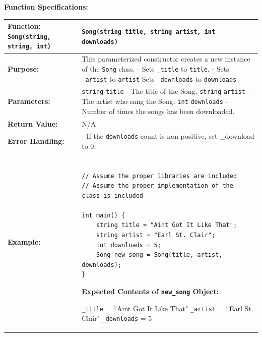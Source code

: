 \textbf{Function Specifications:}

\renewcommand{\arraystretch}{1.5}
\begin{longtable}{|p{1.7in}|p{4.3in}|}
\hline
\textbf{Function:} \texttt{Song(string, string, int)}& \texttt{Song(string title, string artist, int downloads)}\\ \hline

\textbf{Purpose:} & This parameterized constructor creates a new instance of the \texttt{Song} class. \newline
- Sets \texttt{_title} to \texttt{title}. \newline
- Sets \texttt{_artist} to \texttt{artist} \newline
Sets \texttt{_downloads} to \texttt{downloads}\\ \hline

\textbf{Parameters:} & 
\texttt{string} \texttt{title} - The title of the Song. \newline
\texttt{string} \texttt{artist} - The artist who sang the Song. \newline
\texttt{int} \texttt{downloads} - Number of times the songs has been downloaded. \\ \hline

\textbf{Return Value:} & N/A \\ \hline

\textbf{Error Handling:} & 
- If the \texttt{downloads} count is non-positive, set \_download to 0. \\ \hline

\textbf{Example:} & 


\begin{example}


\begin{verbatim}

// Assume the proper libraries are included
// Assume the proper implementation of the class is included

int main() {
    string title = "Aint Got It Like That";
    string artist = "Earl St. Clair";
    int downloads = 5;
    Song new_song = Song(title, artist, downloads);
}
\end{verbatim}
\end{example}

\textbf{Expected Contents of \texttt{new_song} Object:}

\vspace{5pt}
\texttt{_title} = ``Aint Got It Like That" \newline
\texttt{_artist} = ``Earl St. Clair"
\newline
\texttt{_downloads} = 5
\vspace{5pt}\\ \hline
\end{longtable}


